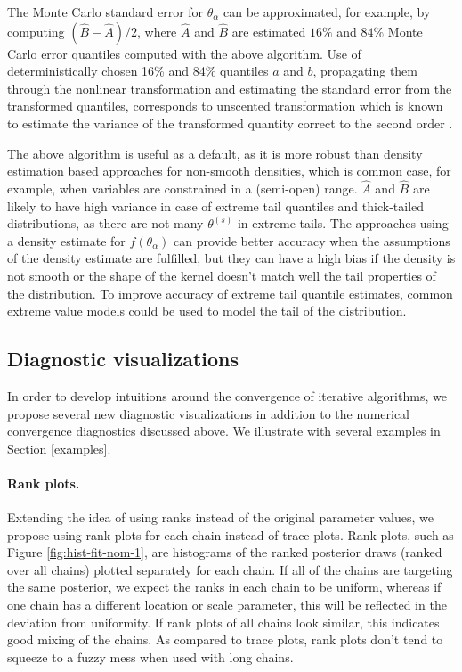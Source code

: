 \documentclass[american,]{article}
\let\oldparagraph\paragraph
\renewcommand{\paragraph}[1]{\oldparagraph{#1}\mbox{}}
\theoremstyle{definition}
\begin{document}
The Monte Carlo standard error for \(\hat{\theta}_\alpha\) can be
approximated, for example, by computing $(\widehat{B}-\widehat{A})/2$,
where $\widehat{A}$ and $\widehat{B}$ are estimated \(16\%\) and
\(84\%\) Monte Carlo error quantiles computed with the above
algorithm.
%
Use of deterministically chosen 16\% and 84\% quantiles $a$ and $b$,
propagating them through the nonlinear transformation and estimating
the standard error from the transformed quantiles, corresponds to
unscented transformation which is known to estimate the variance of
the transformed quantity correct to the second order
\citep{Julier+Uhlman:1997:unscented}.

The above algorithm is useful as a default, as it is more robust than
density estimation based approaches for
non-smooth densities, which is common case, for example, when
variables are constrained in a (semi-open) range.  $\widehat{A}$ and $\widehat{B}$ are likely
to have high variance in case of extreme tail quantiles and thick-tailed distributions,
as there are not many $\theta^{(s)}$ in extreme
tails. The approaches using a density estimate for \(f(\theta_\alpha)\)
can provide better accuracy when the assumptions of the density estimate
are fulfilled, but they can have a high bias if the density is not
smooth or the shape of the kernel doesn't match well the tail
properties of the distribution. To improve accuracy of extreme tail
quantile estimates, common extreme value models could be used to model
the tail of the distribution.

\hypertarget{diagnostic-visualizations}{%
\subsection{Diagnostic visualizations}\label{diagnostic-visualizations}}

In order to develop intuitions around the convergence of iterative algorithms, we
propose several new diagnostic visualizations in addition to the numerical
convergence diagnostics discussed above. We illustrate with several examples in Section
\ref{examples}.

\hypertarget{rank-plots}{%
\paragraph{Rank plots.}\label{rank-plots}}
Extending the idea of using ranks instead of the original parameter
values, we propose using rank plots for each chain instead
of trace plots. Rank plots, such as Figure \ref{fig:hist-fit-nom-1}, are histograms of the
ranked posterior draws (ranked over all chains) plotted separately for
each chain. If all of the chains are targeting the same posterior, we expect the 
ranks in each chain to be uniform, whereas if one chain has a different location
or scale parameter, this will be reflected in the deviation from uniformity. 
 If rank plots of all chains look similar, this indicates
good mixing of the chains. As compared to trace plots, rank plots don't
tend to squeeze to a fuzzy mess when used with long chains.
\end{document}
